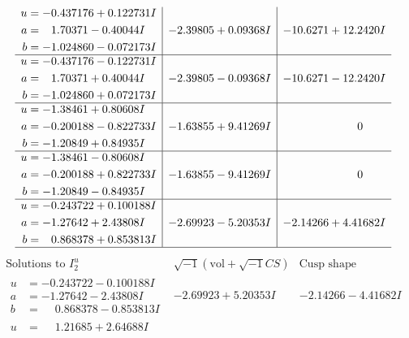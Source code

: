 \documentclass[1p]{elsarticle_modified}
\theoremstyle{definition}
\newcommand{\I}{\sqrt{-1}}
\begin{document}
$$\begin{array}{c|c|c}
\begin{aligned}
u &= -0.437176 + 0.122731 I \\
a &= \phantom{-}1.70371 - 0.40044 I \\
b &= -1.024860 - 0.072173 I\end{aligned}
 & -2.39805 + 0.09368 I & -10.6271 + 12.2420 I \\ \hline\begin{aligned}
u &= -0.437176 - 0.122731 I \\
a &= \phantom{-}1.70371 + 0.40044 I \\
b &= -1.024860 + 0.072173 I\end{aligned}
 & -2.39805 - 0.09368 I & -10.6271 - 12.2420 I \\ \hline\begin{aligned}
u &= -1.38461 + 0.80608 I \\
a &= -0.200188 - 0.822733 I \\
b &= -1.20849 + 0.84935 I\end{aligned}
 & -1.63855 + 9.41269 I & \phantom{-0.000000 } 0 \\ \hline\begin{aligned}
u &= -1.38461 - 0.80608 I \\
a &= -0.200188 + 0.822733 I \\
b &= -1.20849 - 0.84935 I\end{aligned}
 & -1.63855 - 9.41269 I & \phantom{-0.000000 } 0 \\ \hline\begin{aligned}
u &= -0.243722 + 0.100188 I \\
a &= -1.27642 + 2.43808 I \\
b &= \phantom{-}0.868378 + 0.853813 I\end{aligned}
 & -2.69923 - 5.20353 I & -2.14266 + 4.41682 I\\
 \hline 
 \end{array}$$\newpage$$\begin{array}{c|c|c}  
\text{Solutions to }I^u_{2}& \I (\text{vol} + \sqrt{-1}CS) & \text{Cusp shape}\\
 \hline 
\begin{aligned}
u &= -0.243722 - 0.100188 I \\
a &= -1.27642 - 2.43808 I \\
b &= \phantom{-}0.868378 - 0.853813 I\end{aligned}
 & -2.69923 + 5.20353 I & -2.14266 - 4.41682 I \\ \hline\begin{aligned}
u &= \phantom{-}1.21685 + 2.64688 I \\

\end{aligned}
\end{array}$$
\end{document}
